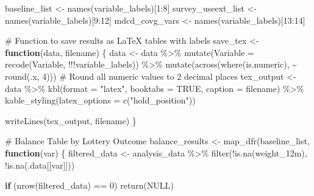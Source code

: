 \documentclass[
  letterpaper,
  DIV=11,
  numbers=noendperiod]{scrartcl}
\newenvironment{Shaded}{\begin{snugshade}}{\end{snugshade}}
\newcommand{\AttributeTok}[1]{\textcolor[rgb]{0.40,0.45,0.13}{#1}}
\newcommand{\CommentTok}[1]{\textcolor[rgb]{0.37,0.37,0.37}{#1}}
\newcommand{\ConstantTok}[1]{\textcolor[rgb]{0.56,0.35,0.01}{#1}}
\newcommand{\ControlFlowTok}[1]{\textcolor[rgb]{0.00,0.23,0.31}{\textbf{#1}}}
\newcommand{\DecValTok}[1]{\textcolor[rgb]{0.68,0.00,0.00}{#1}}
\newcommand{\FunctionTok}[1]{\textcolor[rgb]{0.28,0.35,0.67}{#1}}
\newcommand{\NormalTok}[1]{\textcolor[rgb]{0.00,0.23,0.31}{#1}}
\newcommand{\OtherTok}[1]{\textcolor[rgb]{0.00,0.23,0.31}{#1}}
\newcommand{\SpecialCharTok}[1]{\textcolor[rgb]{0.37,0.37,0.37}{#1}}
\newcommand{\StringTok}[1]{\textcolor[rgb]{0.13,0.47,0.30}{#1}}
\begin{document}
\begin{Shaded}
\begin{Highlighting}[]
\NormalTok{baseline\_list }\OtherTok{\textless{}{-}} \FunctionTok{names}\NormalTok{(variable\_labels)[}\DecValTok{1}\SpecialCharTok{:}\DecValTok{8}\NormalTok{]}
\NormalTok{survey\_useext\_list }\OtherTok{\textless{}{-}} \FunctionTok{names}\NormalTok{(variable\_labels)[}\DecValTok{9}\SpecialCharTok{:}\DecValTok{12}\NormalTok{]}
\NormalTok{mdcd\_covg\_vars }\OtherTok{\textless{}{-}} \FunctionTok{names}\NormalTok{(variable\_labels)[}\DecValTok{13}\SpecialCharTok{:}\DecValTok{14}\NormalTok{]}

\CommentTok{\# Function to save results as LaTeX tables with labels}
\NormalTok{save\_tex }\OtherTok{\textless{}{-}} \ControlFlowTok{function}\NormalTok{(data, filename) \{}
\NormalTok{  data }\OtherTok{\textless{}{-}}\NormalTok{ data }\SpecialCharTok{\%\textgreater{}\%} 
    \FunctionTok{mutate}\NormalTok{(}\AttributeTok{Variable =} \FunctionTok{recode}\NormalTok{(Variable, }\SpecialCharTok{!!!}\NormalTok{variable\_labels)) }\SpecialCharTok{\%\textgreater{}\%} 
    \FunctionTok{mutate}\NormalTok{(}\FunctionTok{across}\NormalTok{(}\FunctionTok{where}\NormalTok{(is.numeric), }\SpecialCharTok{\textasciitilde{}} \FunctionTok{round}\NormalTok{(.x, }\DecValTok{4}\NormalTok{)))  }\CommentTok{\# Round all numeric values to 2 decimal places}
\NormalTok{  tex\_output }\OtherTok{\textless{}{-}}\NormalTok{ data }\SpecialCharTok{\%\textgreater{}\%}
    \FunctionTok{kbl}\NormalTok{(}\AttributeTok{format =} \StringTok{"latex"}\NormalTok{, }\AttributeTok{booktabs =} \ConstantTok{TRUE}\NormalTok{, }\AttributeTok{caption =}\NormalTok{ filename) }\SpecialCharTok{\%\textgreater{}\%}
    \FunctionTok{kable\_styling}\NormalTok{(}\AttributeTok{latex\_options =} \FunctionTok{c}\NormalTok{(}\StringTok{"hold\_position"}\NormalTok{))}
  
  \FunctionTok{writeLines}\NormalTok{(tex\_output, filename)}
\NormalTok{\}}



\CommentTok{\# Balance Table by Lottery Outcome}
\NormalTok{balance\_results }\OtherTok{\textless{}{-}} \FunctionTok{map\_dfr}\NormalTok{(baseline\_list, }\ControlFlowTok{function}\NormalTok{(var) \{}
\NormalTok{  filtered\_data }\OtherTok{\textless{}{-}}\NormalTok{ analysis\_data }\SpecialCharTok{\%\textgreater{}\%}
    \FunctionTok{filter}\NormalTok{(}\SpecialCharTok{!}\FunctionTok{is.na}\NormalTok{(weight\_12m), }\SpecialCharTok{!}\FunctionTok{is.na}\NormalTok{(.data[[var]]))}
  
  \ControlFlowTok{if}\NormalTok{ (}\FunctionTok{nrow}\NormalTok{(filtered\_data) }\SpecialCharTok{==} \DecValTok{0}\NormalTok{) }\FunctionTok{return}\NormalTok{(}\ConstantTok{NULL}\NormalTok{)}
  

\end{Highlighting}
\end{Shaded}
\end{document}
